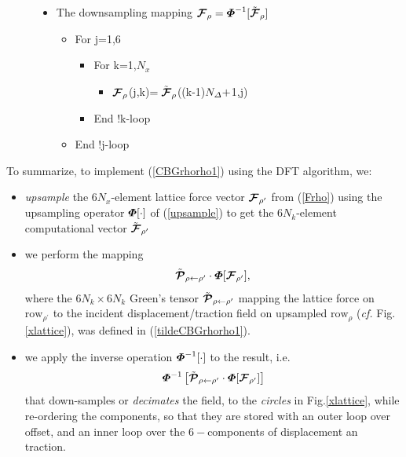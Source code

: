 \begin{samepage}
\begin{figure}
{\begin{minipage} {140.0mm}
\begin{tt}
\begin{itemize}
\end{itemize}

\vspace{2 mm}

\begin{itemize}
\item The downsampling  mapping ${\mbox{\boldmath$\cal F$\unboldmath}}_{\rho}={\mbox{\boldmath$\mit \Phi$\unboldmath}}^{-1}[\tilde{\mbox{\boldmath$\cal F$\unboldmath}}_{\rho}]$
\begin{itemize}
\item For j=1,6
\begin{itemize}
\item For k=1,$N_x$
\begin{itemize}
\item ${\mbox{\boldmath$\cal F$\unboldmath}}_{\rho}$(j,k)$=\tilde{\mbox{\boldmath$\cal F$\unboldmath}}_{\rho}$((k-1)$N_{\mit 
\Delta}+$1,j)
\end{itemize}
\item End !k-loop
\end{itemize}
\item End !j-loop
\end{itemize}
\end{itemize}

\end{tt} 

\vspace{2 mm}
\end{minipage}
}
\end{figure}
\vfill
\end{samepage}

To summarize, to implement (\ref{CBGrhorho1}) using the DFT algorithm, we:
\begin{itemize}
\item {\em upsample\/} the $6 N_x$-element lattice force vector ${\mbox{\boldmath$\cal F$\unboldmath}}_{{\rho }^{\prime}}$ 
from (\ref{Frho}) using the 
upsampling operator ${\mbox{\boldmath$\mit \Phi$\unboldmath}}[\cdot]$ of (\ref{upsample}) to get the 
$6 N_k$-element computational vector $\tilde{\mbox{\boldmath$\cal F$\unboldmath}}_{{\rho }^{\prime}}$

\item we perform the  mapping 
\[
\tilde{\mbox{\boldmath$\cal P$\unboldmath}}_{ \rho \leftarrow {\rho }^{\prime}}\cdot{\mbox{\boldmath$\mit \Phi$\unboldmath}}[{\mbox{\boldmath$\cal F$\unboldmath}}_{{\rho 
}^{\prime}}],
\] 
where the $6 N_k \times 6 N_k$ Green's tensor $\tilde{\mbox{\boldmath$\cal P$\unboldmath}}_{ \rho 
\leftarrow {\rho }^{\prime}}$ mapping the lattice force on 
$\mbox{row}_{\rho^{\prime}}$ to the 
incident displacement/traction  field on upsampled $\mbox{row}_{\rho}$ 
({\em cf.\/} Fig.\ref{xlattice}),  was defined 
in (\ref{tildeCBGrhorho1}).

\item we apply the inverse operation ${\mbox{\boldmath$\mit \Phi$\unboldmath}}^{-1}[\cdot]$ to the 
result, i.e.
\[
{\mbox{\boldmath$\mit \Phi$\unboldmath}}^{-1}\left[\tilde{\mbox{\boldmath$\cal P$\unboldmath}}_{ \rho \leftarrow {\rho }^{\prime}}
\cdot{\mbox{\boldmath$\mit \Phi$\unboldmath}}[{\mbox{\boldmath$\cal F$\unboldmath}}_{{\rho 
}^{\prime}}]\right]
\]
that down-samples or {\em decimates\/} the field, to the {\em circles\/} 
in Fig.\ref{xlattice}, while re-ordering the components, so that they are 
stored with an outer loop over offset, and an inner loop over the 
$6-$components of displacement an traction.
\end{itemize}


